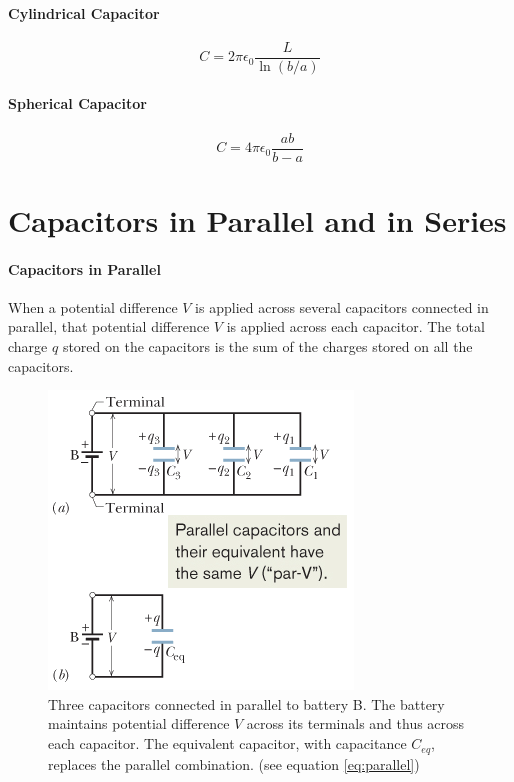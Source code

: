 \documentclass{article}
\begin{document}
        \paragraph{Cylindrical Capacitor}
        \begin{equation}
            C = 2 \pi \epsilon_0 \frac{L}{\ln(b/a)}
        \end{equation}

        \paragraph{Spherical Capacitor}
        \begin{equation}
            C = 4 \pi \epsilon_0 \frac{ab}{b-a}
        \end{equation}

    \section{Capacitors in Parallel and in Series}

        \paragraph{Capacitors in Parallel}
        When a potential difference $V$ is applied across several capacitors connected in parallel, that potential difference $V$ is applied across each capacitor. The total charge $q$ stored on the capacitors is the sum of the charges stored on all the capacitors.

        \begin{figure}[H]
            \centering
            \includegraphics[scale=0.6]{parallel}
            \caption{Three capacitors connected in parallel to battery B. The battery maintains potential difference $V$ across its terminals and thus across each capacitor. The equivalent capacitor, with capacitance $C_{eq}$, replaces the parallel combination. (see equation \ref{eq:parallel})}
        \end{figure}
\end{document}
